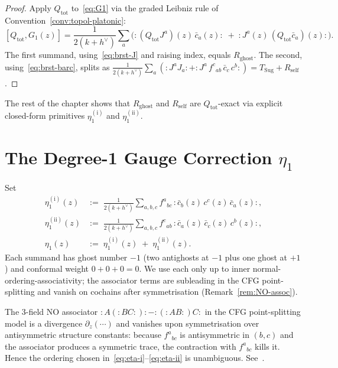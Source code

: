 \begin{proof}
Apply $Q_{\mathrm{tot}}$ to~\eqref{eq:G1} via the graded Leibniz
rule of Convention~\ref{conv:topol-platonic}:
\[
 [Q_{\mathrm{tot}}, G_1(z)]
 = \frac{1}{2(k+h^\vee)}\sum_a
 \bigl(
 {:}(Q_{\mathrm{tot}} J^a)(z)\,\bar c_a(z){:}
 \;+\;
 {:}J^a(z)\,(Q_{\mathrm{tot}} \bar c_a)(z){:}
 \bigr).
\]
The first summand, using~\eqref{eq:brst-J} and raising index,
equals $R_{\mathrm{ghost}}$. The second, using~\eqref{eq:brst-barc},
splits as
$\tfrac{1}{2(k+h^\vee)} \sum_a ({:}J^a J_a{:} + {:}J^a\,f^c{}_{ab}\,\bar c_c\,c^b{:})
= T_{\mathrm{Sug}} + R_{\mathrm{self}}$.
\end{proof}

The rest of the chapter shows that $R_{\mathrm{ghost}}$ and
$R_{\mathrm{self}}$ are $Q_{\mathrm{tot}}$-exact via explicit
closed-form primitives $\eta_1^{(\mathrm i)}$ and
$\eta_1^{(\mathrm{ii})}$.

\section{The Degree-1 Gauge Correction \texorpdfstring{$\eta_1$}{eta1}}
\label{sec:eta1}

\begin{definition}
\label{def:eta1}
Set
\begin{align}
 \eta_1^{(\mathrm i)}(z)
 &:=\; \frac{1}{2(k+h^\vee)}\sum_{a,b,c}
 f^a{}_{bc}\,{:}\bar c_b(z)\,c^c(z)\,\bar c_a(z){:},
 \label{eq:eta-i}\\
 \eta_1^{(\mathrm{ii})}(z)
 &:=\; \frac{1}{2(k+h^\vee)}\sum_{a,b,c}
 f^c{}_{ab}\,{:}\bar c_a(z)\,\bar c_c(z)\,c^b(z){:}, \label{eq:eta-ii}\\
 \eta_1(z)
 &:=\; \eta_1^{(\mathrm i)}(z) \;+\;
 \eta_1^{(\mathrm{ii})}(z). \label{eq:eta-total}
\end{align}
Each summand has ghost number $-1$ (two antighosts at $-1$ plus
one ghost at $+1$) and conformal weight $0+0+0 = 0$. We use each
only up to inner normal-ordering-associativity; the associator
terms are subleading in the CFG point-splitting and vanish on
cochains after symmetrisation (Remark~\ref{rem:NO-assoc}).
\end{definition}

\begin{remark}
\label{rem:NO-assoc}
The $3$-field NO associator
${:}A({:}BC{:}){:} - {:}({:}AB{:})C{:}$ in the CFG point-splitting
model is a divergence $\partial_z(\cdots)$ and vanishes upon
symmetrisation over antisymmetric structure constants: because
$f^a{}_{bc}$ is antisymmetric in $(b,c)$ and the associator produces a
symmetric trace, the contraction with $f^a{}_{bc}$ kills it.
Hence the ordering chosen in~\eqref{eq:eta-i}--\eqref{eq:eta-ii}
is unambiguous. See~\cite[\S5.3]{CG1}.
\end{remark}


